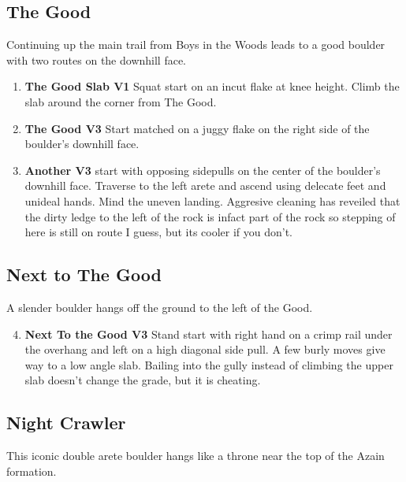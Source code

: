 \subsection*{The Good}\label{bf:The Good}
Continuing up the main trail from Boys in the Woods leads to a good boulder with two routes on the downhill face.

\begin{enumerate}[]
	\setcounter{enumi}{0}
	\item\label{rt:The Good Slab} \colorbox{green!20}{\textbf{The Good Slab V1    } }
	\newline Squat start on an incut flake at knee height. Climb the slab around the corner from The Good.\
	\setcounter{enumi}{1}
	\item\label{rt:The Good} \colorbox{green!20}{\textbf{The Good V3    } }
	\newline Start matched on a juggy flake on the right side of the boulder's downhill face.\
	\setcounter{enumi}{2}
	\item\label{rt:Another} \colorbox{green!20}{\textbf{Another V3 \ding{72}  \warn } }
	\newline start with opposing sidepulls on the center of the boulder's downhill face. Traverse to the left arete and ascend using delecate feet and unideal hands. Mind the uneven landing. Aggresive cleaning has reveiled that the dirty ledge to the left of the rock is infact part of the rock so stepping of here is still on route I guess, but its cooler if you don't.\
\end{enumerate}
\subsection*{Next to The Good}\label{bf:Next to The Good}
A slender boulder hangs off the ground to the left of the Good.

\begin{enumerate}[]
	\setcounter{enumi}{3}
	\item\label{rt:Next To the Good} \colorbox{green!20}{\textbf{Next To the Good V3   \warn } }
	\newline Stand start with right hand on a crimp rail under the overhang and left on a high diagonal side pull. A few burly moves give way to a low angle slab. Bailing into the gully instead of climbing the upper slab doesn't change the grade, but it is cheating.\
\end{enumerate}
\subsection*{Night Crawler}\label{bf:Night Crawler}
This iconic double arete boulder hangs like a throne near the top of the Azain formation.

